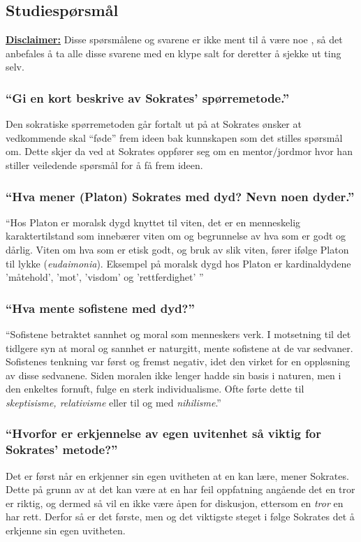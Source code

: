 \documentclass[a4paper]{IEEEtran}
\begin{document}
    \subsection{Studiespørsmål}
    \underline{\textbf{Disclaimer:}} Disse spørsmålene og svarene er ikke ment til 
    å være noe , så det anbefales å ta alle disse svarene med en 
    klype salt for deretter å sjekke ut ting selv.
        \subsubsection{``Gi en kort beskrive av Sokrates' spørremetode.''}
        Den sokratiske spørremetoden går fortalt ut på at Sokrates ønsker at vedkommende 
        skal ``føde'' frem ideen bak kunnskapen som det stilles spørsmål om. 
        Dette skjer da ved at Sokrates oppfører seg om en mentor/jordmor hvor
        han stiller veiledende spørsmål for å få frem ideen. \medskip

        \subsubsection{``Hva mener (Platon) Sokrates med dyd? Nevn noen dyder.''}
        ``Hos Platon er moralsk dygd knyttet til viten, det er en menneskelig 
        karaktertilstand som innebærer viten om og begrunnelse av hva som er godt 
        og dårlig. Viten om hva som er etisk godt, og bruk av slik viten, fører 
        ifølge Platon til lykke (\textit{eudaimonia}). Eksempel på moralsk 
        dygd hos Platon er kardinaldydene 'måtehold', 'mot', 'visdom' og 
        'rettferdighet' ''\cite{snl_dyd} \medskip

        \subsubsection{``Hva mente sofistene med dyd?''}
        ``Sofistene betraktet sannhet og moral som menneskers verk. I motsetning til 
        det tidlgere syn at moral og sannhet er naturgitt, mente sofistene at de var 
        sedvaner. Sofistenes tenkning var først og fremst negativ, idet den virket for 
        en oppløsning av disse sedvanene. Siden moralen ikke lenger hadde sin basis
        i naturen, men i den enkeltes fornuft, fulge en sterk individualisme. Ofte
        førte dette til \textit{skeptisisme, relativisme} eller til og med 
        \textit{nihilisme}.'' \cite{snl_sofist} \medskip
        
        \subsubsection{``Hvorfor er erkjennelse av egen uvitenhet så viktig for Sokrates'
        metode?''}
        Det er først når en erkjenner sin egen uvitheten at en kan lære, mener Sokrates.
        Dette på grunn av at det kan være at en har feil oppfatning angående 
        det en tror er riktig, og dermed så vil en ikke være åpen for diskusjon, 
        ettersom en \textit{tror} en har rett. Derfor så er det første, 
        men og det viktigste steget i følge Sokrates det å erkjenne sin egen 
        uvitheten. \medskip
\end{document}
